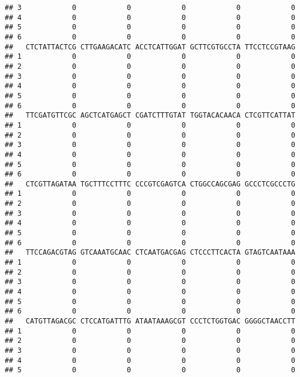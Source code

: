 \documentclass[]{article}
\begin{document}
\begin{verbatim}
## 3            0            0            0            0            0
## 4            0            0            0            0            0
## 5            0            0            0            0            0
## 6            0            0            0            0            0
##   CTCTATTACTCG CTTGAAGACATC ACCTCATTGGAT GCTTCGTGCCTA TTCCTCCGTAAG
## 1            0            0            0            0            0
## 2            0            0            0            0            0
## 3            0            0            0            0            0
## 4            0            0            0            0            0
## 5            0            0            0            0            0
## 6            0            0            0            0            0
##   TTCGATGTTCGC AGCTCATGAGCT CGATCTTTGTAT TGGTACACAACA CTCGTTCATTAT
## 1            0            0            0            0            0
## 2            0            0            0            0            0
## 3            0            0            0            0            0
## 4            0            0            0            0            0
## 5            0            0            0            0            0
## 6            0            0            0            0            0
##   CTCGTTAGATAA TGCTTTCCTTTC CCCGTCGAGTCA CTGGCCAGCGAG GCCCTCGCCCTG
## 1            0            0            0            0            0
## 2            0            0            0            0            0
## 3            0            0            0            0            0
## 4            0            0            0            0            0
## 5            0            0            0            0            0
## 6            0            0            0            0            0
##   TTCCAGACGTAG GTCAAATGCAAC CTCAATGACGAG CTCCCTTCACTA GTAGTCAATAAA
## 1            0            0            0            0            0
## 2            0            0            0            0            0
## 3            0            0            0            0            0
## 4            0            0            0            0            0
## 5            0            0            0            0            0
## 6            0            0            0            0            0
##   CATGTTAGACGC CTCCATGATTTG ATAATAAAGCGT CCCTCTGGTGAC GGGGCTAACCTT
## 1            0            0            0            0            0
## 2            0            0            0            0            0
## 3            0            0            0            0            0
## 4            0            0            0            0            0
## 5            0            0            0            0            0

\end{verbatim}
\end{document}
